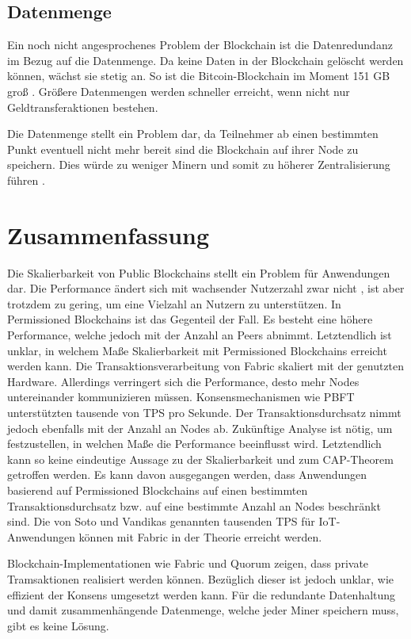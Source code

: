 \subsection{Datenmenge}
Ein noch nicht angesprochenes Problem der Blockchain ist die Datenredundanz im Bezug auf die Datenmenge. Da keine Daten in der Blockchain gelöscht werden können, wächst sie stetig an. So ist die Bitcoin-Blockchain im Moment 151 GB groß \cite{BlockchainUnternehmenBlockchainSizeBitcoin}. Größere Datenmengen werden schneller erreicht, wenn nicht nur Geldtransferaktionen bestehen.

Die Datenmenge stellt ein Problem dar, da Teilnehmer ab einen bestimmten Punkt eventuell nicht mehr bereit sind die Blockchain auf ihrer Node zu speichern. Dies würde zu weniger Minern und somit zu höherer Zentralisierung führen \cite{SchererPerformanceScalabilityBlockchain2017}.

\section{Zusammenfassung}
Die Skalierbarkeit von Public Blockchains stellt ein Problem für Anwendungen dar. Die Performance ändert sich mit wachsender Nutzerzahl zwar nicht \cite{SchererPerformanceScalabilityBlockchain2017}, ist aber trotzdem zu gering, um eine Vielzahl an Nutzern zu unterstützen. In Permissioned Blockchains ist das Gegenteil der Fall. Es besteht eine höhere Performance, welche jedoch mit der Anzahl an Peers abnimmt. Letztendlich ist unklar, in welchem Maße Skalierbarkeit mit Permissioned Blockchains erreicht werden kann. Die Transaktionsverarbeitung von Fabric skaliert mit der genutzten Hardware. Allerdings verringert sich die Performance, desto mehr Nodes untereinander kommunizieren müssen. Konsensmechanismen wie \acs{PBFT} unterstützten tausende von \acs{TPS} pro Sekunde. Der Transaktionsdurchsatz nimmt jedoch ebenfalls mit der Anzahl an Nodes ab. Zukünftige Analyse ist nötig, um festzustellen, in welchen Maße die Performance beeinflusst wird. Letztendlich kann so keine eindeutige Aussage zu der Skalierbarkeit und zum CAP-Theorem getroffen werden. Es kann davon ausgegangen werden, dass Anwendungen basierend auf Permissioned Blockchains auf einen bestimmten Transaktionsdurchsatz bzw. auf eine bestimmte Anzahl an Nodes beschränkt sind. Die von Soto und Vandikas genannten tausenden \acs{TPS} für IoT-Anwendungen können mit Fabric in der Theorie erreicht werden. 

Blockchain-Implementationen wie Fabric und Quorum zeigen, dass private Tramsaktionen realisiert werden können. Bezüglich dieser ist jedoch unklar, wie effizient der Konsens umgesetzt werden kann. Für die redundante Datenhaltung und damit zusammenhängende Datenmenge, welche jeder Miner speichern muss, gibt es keine Lösung.





